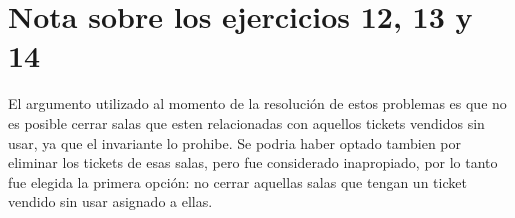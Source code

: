 \documentclass[spanish,a4paper]{article}
\begin{document}
\section {Nota sobre los ejercicios 12, 13 y 14}
El argumento utilizado al momento de la resolución de estos problemas es que no es posible cerrar salas que esten relacionadas con aquellos tickets vendidos sin usar, ya que el invariante lo prohibe. Se podria haber optado tambien por eliminar los tickets de esas salas, pero fue considerado inapropiado, por lo tanto fue elegida la primera opción: no cerrar aquellas salas que tengan un ticket vendido sin usar asignado a ellas.
\end{document}
